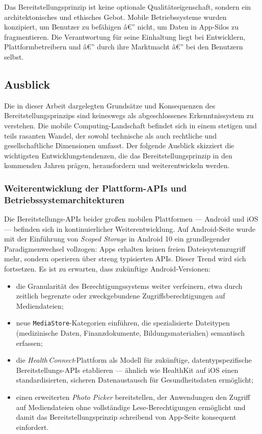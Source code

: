 ﻿\documentclass[12pt, a4paper]{article}
\begin{document}
Das Bereitstellungsprinzip ist keine optionale Qualitätseigenschaft, sondern
ein architektonisches und ethisches Gebot. Mobile Betriebssysteme wurden
konzipiert, um Benutzer zu befähigen â€” nicht, um Daten in App-Silos zu
fragmentieren. Die Verantwortung für seine Einhaltung liegt bei Entwicklern,
Plattformbetreibern und â€” durch ihre Marktmacht â€” bei den Benutzern selbst.

\subsection{Ausblick}
\label{sec:ausblick}

Die in dieser Arbeit dargelegten Grundsätze und Konsequenzen des Bereitstellungsprinzips
sind keineswegs als abgeschlossenes Erkenntnissystem zu verstehen. Die mobile
Computing-Landschaft befindet sich in einem stetigen und teils rasanten Wandel,
der sowohl technische als auch rechtliche und gesellschaftliche Dimensionen umfasst.
Der folgende Ausblick skizziert die wichtigsten Entwicklungstendenzen, die das
Bereitstellungsprinzip in den kommenden Jahren prägen, herausfordern und
weiterentwickeln werden.

\subsubsection{Weiterentwicklung der Plattform-APIs und Betriebssystemarchitekturen}

Die Bereitstellungs-APIs beider großen mobilen Plattformen --- Android und iOS --- befinden
sich in kontinuierlicher Weiterentwicklung. Auf Android-Seite wurde mit der Einführung
von \emph{Scoped Storage} in Android 10 ein grundlegender Paradigmenwechsel vollzogen:
Apps erhalten keinen freien Dateisystemzugriff mehr, sondern operieren über streng
typisierten APIs. Dieser Trend wird sich fortsetzen. Es ist zu erwarten, dass
zukünftige Android-Versionen:
\begin{itemize}[leftmargin=*]
  \item die Granularität des Berechtigungssystems weiter verfeinern, etwa durch
    zeitlich begrenzte oder zweckgebundene Zugriffsberechtigungen auf Mediendateien;
  \item neue \texttt{MediaStore}-Kategorien einführen, die spezialisierte Dateitypen
    (medizinische Daten, Finanzdokumente, Bildungsmaterialien) semantisch erfassen;
  \item die \emph{Health\,Connect}-Plattform als Modell für zukünftige, datentypspezifische
    Bereitstellungs-APIs etablieren --- ähnlich wie HealthKit auf iOS einen
    standardisierten, sicheren Datenaustausch für Gesundheitsdaten ermöglicht;
  \item einen erweiterten \emph{Photo Picker} bereitstellen, der Anwendungen den Zugriff
    auf Mediendateien ohne vollständige Lese-Berechtigungen ermöglicht und damit das
    Bereitstellungsprinzip schreibend von App-Seite konsequent einfordert.
\end{itemize}
\end{document}
